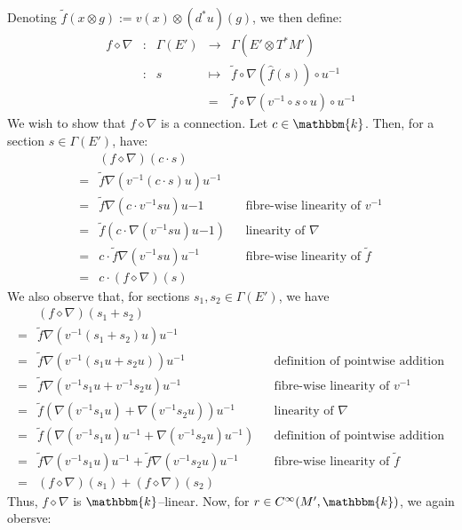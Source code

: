 \documentclass{amsart}
\newcommand{\K}{\mathbbm{k}}
\newcommand{\wh}{\widehat}
\newcommand{\tensor}{\otimes}
\renewcommand{\to}[1][]{\stackrel{#1}{\longrightarrow}}
\renewcommand{\mapsto}{\longmapsto}
\newcommand{\Cinf}{C^{\infty}}
\numberwithin{thm}{section}
\theoremstyle{definition}
\begin{document}
Denoting $\tilde{f}(x \tensor g) := v(x) \tensor (d^*u)(g)$, we then define:
\[\begin{array}{ccccc}
f \diamond \nabla
&:& \Gamma(E') &\to    & \Gamma(E' \tensor T^*M') \\
&:& s &\mapsto& \tilde{f} \circ \nabla(\wh{f}(s)) \circ u^{-1} \\
&&& = &
  \tilde{f} \circ \nabla(v^{-1} \circ s \circ u) \circ u^{-1}
\end{array}\]
We wish to show that $f \diamond \nabla$ is a connection.
Let $c \in \K$. Then, for a section $s \in \Gamma(E')$, have:
\begin{align*}
   & (f \diamond \nabla)(c \cdot s) \\
  =& \tilde{f}\nabla(v^{-1}(c \cdot s)u)u^{-1} \\
  =& \tilde{f}\nabla(c \cdot v^{-1}su)u{-1}
      && \text{fibre-wise linearity of } v^{-1} \\
  =& \tilde{f} (c \cdot  \nabla(v^{-1}su)u{-1})
      && \text{linearity of } \nabla \\
  =& c \cdot \tilde{f}\nabla(v^{-1}su)u^{-1}
      && \text{fibre-wise linearity of } \tilde{f} \\
  =& c \cdot (f \diamond \nabla)(s)
\end{align*}
We also observe that, for sections $s_1, s_2 \in \Gamma(E')$, we have
\begin{align*}
   & (f \diamond \nabla)(s_1 + s_2)\\
  =& \tilde{f}\nabla(v^{-1}(s_1 + s_2)u)u^{-1} \\
  =& \tilde{f}\nabla(v^{-1}(s_1u + s_2u))u^{-1}
    && \text{definition of pointwise addition} \\
  =& \tilde{f}\nabla(v^{-1}s_1u + v^{-1}s_2u)u^{-1}
    && \text{fibre-wise linearity of } v^{-1} \\
  =& \tilde{f}(\nabla(v^{-1}s_1u)
    + \nabla(v^{-1}s_2u))u^{-1}
    && \text{linearity of } \nabla \\
  =& \tilde{f}(\nabla(v^{-1}s_1u)u^{-1}
    + \nabla(v^{-1}s_2u)u^{-1})
    && \text{definition of pointwise addition} \\
  =& \tilde{f}\nabla(v^{-1}s_1u)u^{-1}
    + \tilde{f}\nabla(v^{-1}s_2u)u^{-1}
    && \text{fibre-wise linearity of } \tilde{f} \\
  =& (f \diamond \nabla)(s_1) + (f \diamond \nabla)(s_2)
\end{align*}
Thus, $f \diamond \nabla$ is $\K$--linear. Now, for $r \in \Cinf(M', \K)$, we
again obersve:
\end{document}
